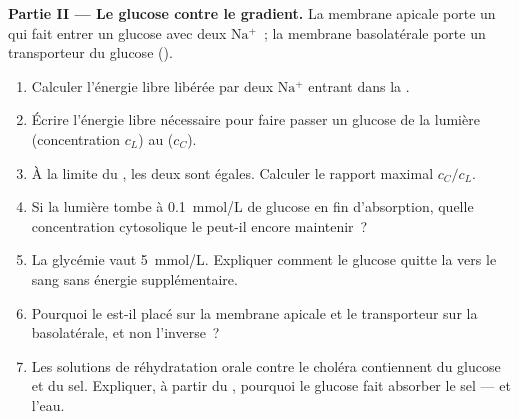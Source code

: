 \begin{problem}
\medskip
\noindent\textbf{Partie II --- Le glucose contre le gradient.}
La membrane apicale porte un  qui fait entrer un glucose avec
deux $\mathrm{Na^+}$~; la membrane basolatérale porte un transporteur du
glucose ().
\begin{enumerate}[resume]
  \item Calculer l'énergie libre libérée par deux $\mathrm{Na^+}$
        entrant dans la .
  \item Écrire l'énergie libre nécessaire pour faire passer un glucose
        de la lumière (concentration $c_L$) au  ($c_C$).
  \item À la limite du , les deux sont égales. Calculer le
        rapport maximal $c_C/c_L$.
  \item Si la lumière tombe à \qty{0.1}{mmol/L} de glucose en fin
        d'absorption, quelle concentration cytosolique le 
        peut-il encore maintenir~?
  \item La glycémie vaut \qty{5}{mmol/L}. Expliquer comment le glucose
        quitte la  vers le sang sans énergie supplémentaire.
  \item Pourquoi le  est-il placé sur la membrane apicale et
        le transporteur sur la basolatérale, et non l'inverse~?
  \item Les solutions de réhydratation orale contre le choléra
        contiennent du glucose et du sel. Expliquer, à partir du
        , pourquoi le glucose fait absorber le sel --- et
        l'eau.
\end{enumerate}


\end{problem}
